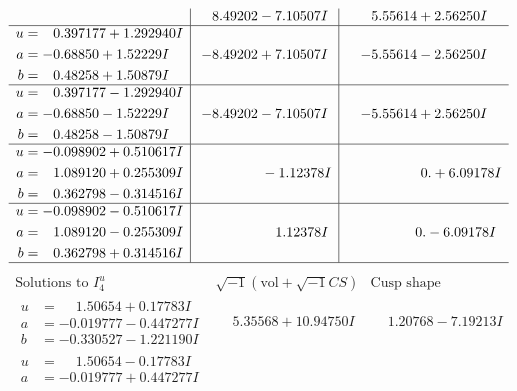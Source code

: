 \documentclass[1p]{elsarticle_modified}
\theoremstyle{definition}
\newcommand{\I}{\sqrt{-1}}
\begin{document}
$$\begin{array}{c|c|c}
 & \phantom{-}8.49202 - 7.10507 I & \phantom{-}5.55614 + 2.56250 I \\ \hline\begin{aligned}
u &= \phantom{-}0.397177 + 1.292940 I \\
a &= -0.68850 + 1.52229 I \\
b &= \phantom{-}0.48258 + 1.50879 I\end{aligned}
 & -8.49202 + 7.10507 I & -5.55614 - 2.56250 I \\ \hline\begin{aligned}
u &= \phantom{-}0.397177 - 1.292940 I \\
a &= -0.68850 - 1.52229 I \\
b &= \phantom{-}0.48258 - 1.50879 I\end{aligned}
 & -8.49202 - 7.10507 I & -5.55614 + 2.56250 I \\ \hline\begin{aligned}
u &= -0.098902 + 0.510617 I \\
a &= \phantom{-}1.089120 + 0.255309 I \\
b &= \phantom{-}0.362798 - 0.314516 I\end{aligned}
 & \phantom{-0.000000 } -1.12378 I & \phantom{-0.000000 -}0. + 6.09178 I \\ \hline\begin{aligned}
u &= -0.098902 - 0.510617 I \\
a &= \phantom{-}1.089120 - 0.255309 I \\
b &= \phantom{-}0.362798 + 0.314516 I\end{aligned}
 & \phantom{-0.000000 -}1.12378 I & \phantom{-0.000000 } 0. - 6.09178 I\\
 \hline 
 \end{array}$$\newpage$$\begin{array}{c|c|c}  
\text{Solutions to }I^u_{4}& \I (\text{vol} + \sqrt{-1}CS) & \text{Cusp shape}\\
 \hline 
\begin{aligned}
u &= \phantom{-}1.50654 + 0.17783 I \\
a &= -0.019777 - 0.447277 I \\
b &= -0.330527 - 1.221190 I\end{aligned}
 & \phantom{-}5.35568 + 10.94750 I & \phantom{-}1.20768 - 7.19213 I \\ \hline\begin{aligned}
u &= \phantom{-}1.50654 - 0.17783 I \\
a &= -0.019777 + 0.447277 I \\

\end{aligned}
\end{array}$$
\end{document}
